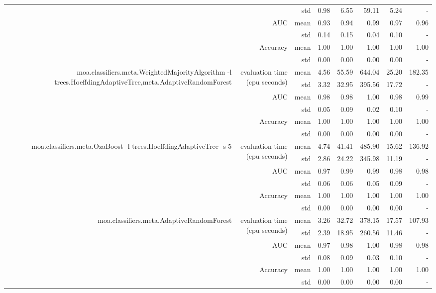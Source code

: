 \documentclass{article}
\begin{document}
\begin{table}[htbp]
\begin{tabular}{rrrrrrrr}
 & & std & 0.98 & 6.55 & 59.11 & 5.24 & -\\
&\multirow{2}[4]{*}{AUC} & mean & 0.93 & 0.94 & 0.99 & 0.97& 0.96\\
 & & std & 0.14 & 0.15 & 0.04 & 0.10 & -\\
&\multirow{2}[4]{*}{Accuracy} & mean & 1.00 & 1.00 & 1.00 & 1.00& 1.00\\
 & & std & 0.00 & 0.00 & 0.00 & 0.00 & -\\
\multirow{6}[6]{*}{moa.classifiers.meta.WeightedMajorityAlgorithm -l trees.HoeffdingAdaptiveTree,meta.AdaptiveRandomForest}&\multirow{2}[4]{*}{evaluation time (cpu seconds)} & mean & 4.56 & 55.59 & 644.04 & 25.20& 182.35\\
 & & std & 3.32 & 32.95 & 395.56 & 17.72 & -\\
&\multirow{2}[4]{*}{AUC} & mean & 0.98 & 0.98 & 1.00 & 0.98& 0.99\\
 & & std & 0.05 & 0.09 & 0.02 & 0.10 & -\\
&\multirow{2}[4]{*}{Accuracy} & mean & 1.00 & 1.00 & 1.00 & 1.00& 1.00\\
 & & std & 0.00 & 0.00 & 0.00 & 0.00 & -\\
\multirow{6}[6]{*}{moa.classifiers.meta.OzaBoost -l trees.HoeffdingAdaptiveTree -s 5}&\multirow{2}[4]{*}{evaluation time (cpu seconds)} & mean & 4.74 & 41.41 & 485.90 & 15.62& 136.92\\
 & & std & 2.86 & 24.22 & 345.98 & 11.19 & -\\
&\multirow{2}[4]{*}{AUC} & mean & 0.97 & 0.99 & 0.99 & 0.98& 0.98\\
 & & std & 0.06 & 0.06 & 0.05 & 0.09 & -\\
&\multirow{2}[4]{*}{Accuracy} & mean & 1.00 & 1.00 & 1.00 & 1.00& 1.00\\
 & & std & 0.00 & 0.00 & 0.00 & 0.00 & -\\
\multirow{6}[6]{*}{moa.classifiers.meta.AdaptiveRandomForest}&\multirow{2}[4]{*}{evaluation time (cpu seconds)} & mean & 3.26 & 32.72 & 378.15 & 17.57& 107.93\\
 & & std & 2.39 & 18.95 & 260.56 & 11.46 & -\\
&\multirow{2}[4]{*}{AUC} & mean & 0.97 & 0.98 & 1.00 & 0.98& 0.98\\
 & & std & 0.08 & 0.09 & 0.03 & 0.10 & -\\
&\multirow{2}[4]{*}{Accuracy} & mean & 1.00 & 1.00 & 1.00 & 1.00& 1.00\\
 & & std & 0.00 & 0.00 & 0.00 & 0.00 & -\\
\bottomrule
\end{tabular}%
\label{tab:addlabel}%
\end{table}%
\end{document}
